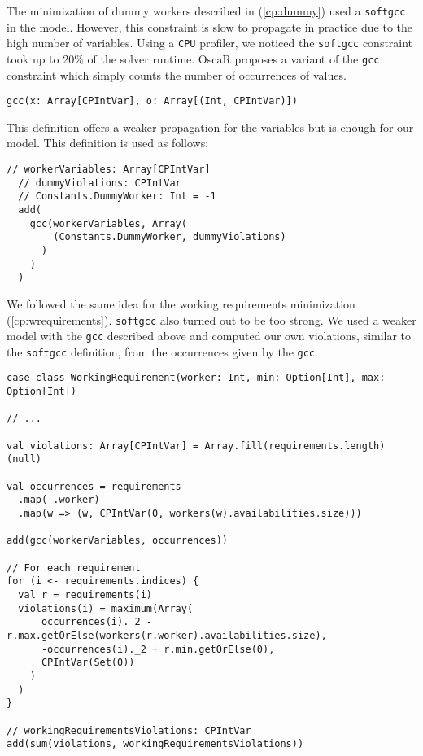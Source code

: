 \documentclass[../thesis.tex]{subfiles}
\begin{document}
The minimization of dummy workers described in (\ref{cp:dummy}) used a \texttt{softgcc} in the model.
However, this constraint is slow to propagate in practice due to the high number of variables.
Using a \texttt{CPU} profiler, we noticed the \texttt{softgcc} constraint took up to 20\% of the solver runtime. 
OscaR proposes a variant of the \texttt{gcc} constraint which simply counts the number of occurrences of values.


\begin{lstlisting}[style=scalaStyle,label={gcc_oscar},caption={Variant of \texttt{gcc} implemented in OscaR},captionpos=b]
gcc(x: Array[CPIntVar], o: Array[(Int, CPIntVar)])
\end{lstlisting}

This definition offers a weaker propagation for the variables but is enough for our model. 
This definition is used as follows:


\begin{lstlisting}[style=scalaStyle,label={gcc_oscar_2},caption={Usage of \texttt{gcc} to count dummy workers},captionpos=b]
  // workerVariables: Array[CPIntVar]
  // dummyViolations: CPIntVar
  // Constants.DummyWorker: Int = -1
  add(
    gcc(workerVariables, Array(
        (Constants.DummyWorker, dummyViolations)
      )
    )
  )
\end{lstlisting}

We followed the same idea for the working requirements minimization (\ref{cp:wrequirements}). \texttt{softgcc} also turned out to be too strong.
We used a weaker model with the \texttt{gcc} described above and computed our own violations, similar to the \texttt{softgcc} definition,
from the occurrences given by the \texttt{gcc}.


\begin{lstlisting}[style=scalaStyle,label={gcc_oscar_2},caption={Usage of \texttt{gcc} to count working requirements violations},captionpos=b]
case class WorkingRequirement(worker: Int, min: Option[Int], max: Option[Int])

// ...

val violations: Array[CPIntVar] = Array.fill(requirements.length)(null)

val occurrences = requirements
  .map(_.worker)
  .map(w => (w, CPIntVar(0, workers(w).availabilities.size)))

add(gcc(workerVariables, occurrences))

// For each requirement 
for (i <- requirements.indices) {
  val r = requirements(i)
  violations(i) = maximum(Array(
      occurrences(i)._2 - r.max.getOrElse(workers(r.worker).availabilities.size),
      -occurrences(i)._2 + r.min.getOrElse(0),
      CPIntVar(Set(0))
    )
  )
}

// workingRequirementsViolations: CPIntVar
add(sum(violations, workingRequirementsViolations))
\end{lstlisting}
\end{document}

